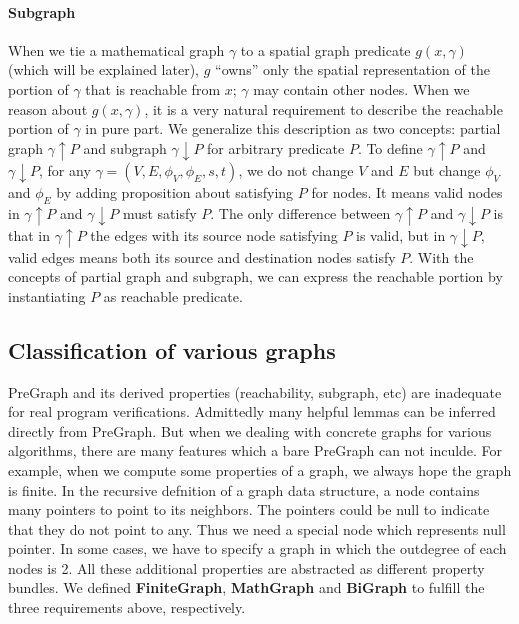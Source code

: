 \paragraph{Subgraph}
When we tie a mathematical graph $\gamma$ to a spatial graph predicate
$g(x, \gamma)$ (which will be explained later), $g$ ``owns'' only the
spatial representation of the portion of $\gamma$ that is reachable
from $x$; $\gamma$ may contain other nodes. When we reason about
$g(x, \gamma)$, it is a very natural requirement to describe the
reachable portion of $\gamma$ in pure part. We generalize this
description as two concepts: partial graph $\gamma \!\uparrow\! P$ and
subgraph $\gamma \!\downarrow\! P$ for arbitrary predicate $P$. To define
$\gamma \!\uparrow\! P$ and $\gamma \!\downarrow\! P$, for any $\gamma=(V,
E, \phi_V, \phi_E, s, t)$, we do not change $V$ and $E$ but change
$\phi_V$ and $\phi_E$ by adding proposition about satisfying $P$ for
nodes. It means valid nodes in $\gamma \!\uparrow\! P$ and
$\gamma \!\downarrow\! P$ must satisfy $P$. The only difference between
$\gamma \!\uparrow\! P$ and $\gamma \!\downarrow\! P$ is that in
$\gamma \!\uparrow\! P$ the edges with its source node satisfying $P$ is
valid, but in $\gamma \!\downarrow\! P$, valid edges means both its source
and destination nodes satisfy $P$. With the concepts of partial graph
and subgraph, we can express the reachable portion by instantiating
$P$ as reachable predicate.

\subsection{Classification of various graphs}

PreGraph and its derived properties (reachability, subgraph, etc) are
inadequate for real program verifications. Admittedly many helpful
lemmas can be inferred directly from PreGraph. But when we dealing
with concrete graphs for various algorithms, there are many features
which a bare PreGraph can not inculde. For example, when we compute
some properties of a graph, we always hope the graph is finite. In the
recursive defnition of a graph data structure, a node contains many
pointers to point to its neighbors. The pointers could be null to
indicate that they do not point to any. Thus we need a special node
which represents null pointer. In some cases, we have to specify a
graph in which the outdegree of each nodes is 2. All these additional
properties are abstracted as different property bundles. We
defined \textbf{FiniteGraph}, \textbf{MathGraph} and \textbf{BiGraph}
to fulfill the three requirements above, respectively.

